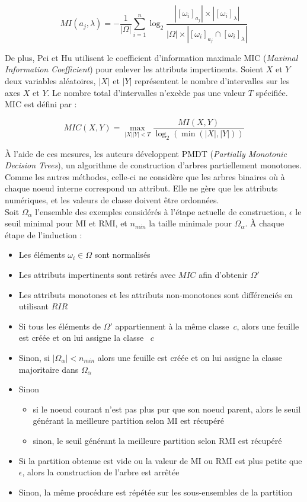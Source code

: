 \documentclass[a4paper]{article}
\begin{document}
$$ MI(a_j, \lambda) = -\frac{1}{|\Omega|} \sum_{i=1}^{n} \log_{2}
\frac{|[\omega_i]_{a_j}|
\times |[\omega_i]_{\lambda}|}{|\Omega| \times |[\omega_i]_{a_j} \cap
[\omega_i]_{\lambda}|}$$

\noindent De plus, Pei et Hu utilisent le coefficient d'information maximale MIC
(\emph{Maximal Information Coefficient}) pour enlever les attributs
impertinents. Soient $X$ et $Y$ deux variables aléatoires, $|X|$ et $|Y|$
représentent le nombre d'intervalles sur les axes $X$ et $Y$. Le nombre total
d'intervalles n'excède pas une valeur $T$ spécifiée. MIC est défini par :

$$ MIC(X, Y) = \max_{|X||Y| < T} \frac{MI(X,Y)}{\log_{2}(\min(|X|,|Y|))}$$

À l'aide de ces mesures, les auteurs développent PMDT (\emph{Partially
Monotonic Decision Trees}), un algorithme de construction d'arbres partiellement
monotones. Comme les autres méthodes, celle-ci ne considère que les arbres
binaires où à chaque noeud interne correspond un attribut. Elle ne gère que les
attributs numériques, et les valeurs de classe doivent être ordonnées. \\

Soit $\Omega_{\alpha}$ l'ensemble des exemples considérés à l'étape actuelle de
construction, $\epsilon$ le seuil minimal pour MI et RMI, et $n_{min}$ la taille
minimale pour $\Omega_{\alpha}$.
À chaque étape de l'induction :
\begin{itemize}
    \item Les éléments $\omega_i \in \Omega$ sont normalisés
    \item Les attributs impertinents sont retirés avec $MIC$ afin d'obtenir $\Omega'$
    \item Les attributs monotones et les attributs non-monotones sont
        différenciés en utilisant $RIR$
    \item Si tous les éléments de $\Omega'$ appartiennent à la même classe~$c$,
        alors une feuille est créée et on lui assigne la classe ~$c$
    \item Sinon, si $|\Omega_{\alpha}| < n_{min}$ alors une feuille est créée et
        on lui assigne la classe majoritaire dans $\Omega_{\alpha}$
    \item Sinon
        \begin{itemize}
            \item si le noeud courant n'est pas plus pur que son noeud parent,
        alors le seuil générant la meilleure partition selon MI est récupéré
    \item sinon, le seuil générant la meilleure partition selon RMI est récupéré
        \end{itemize}
    \item Si la partition obtenue est vide ou la valeur de MI ou RMI est plus
        petite que $\epsilon$, alors la construction de l'arbre est arrêtée
    \item Sinon, la même procédure est répétée sur les sous-ensembles de la
        partition \\
\end{itemize}
\end{document}
